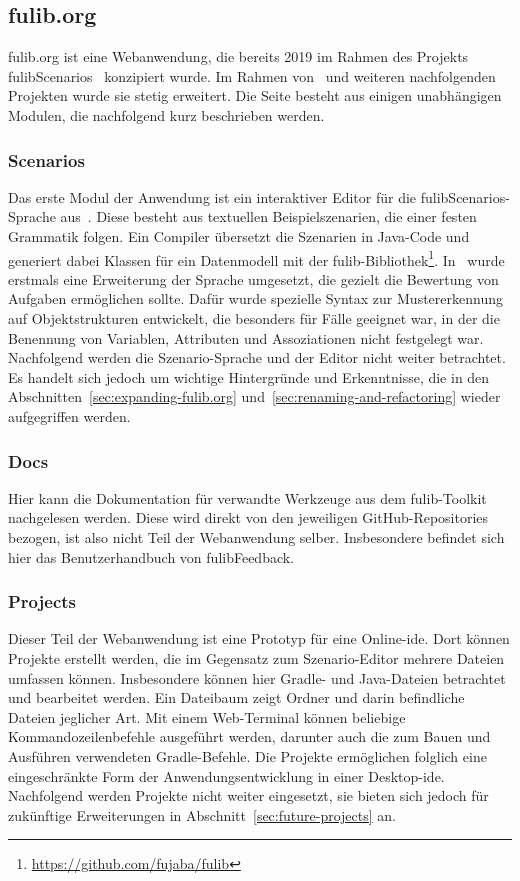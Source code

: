 \subsection{fulib.org}\label{subsec:fulib.org}

fulib.org ist eine Webanwendung, die bereits 2019 im Rahmen des Projekts fulibScenarios~\cite{explain} konzipiert wurde.
Im Rahmen von~\cite{bachelor-thesis} und weiteren nachfolgenden Projekten wurde sie stetig erweitert.
Die Seite besteht aus einigen unabhängigen Modulen, die nachfolgend kurz beschrieben werden.

\subsubsection{Scenarios}
Das erste Modul der Anwendung ist ein interaktiver Editor für die fulibScenarios-Sprache aus~\cite{explain}.
Diese besteht aus textuellen Beispielszenarien, die einer festen Grammatik folgen.
Ein Compiler übersetzt die Szenarien in Java-Code und generiert dabei Klassen für ein Datenmodell mit der fulib-Bibliothek\footnote{\url{https://github.com/fujaba/fulib}}.
In~\cite{bachelor-thesis} wurde erstmals eine Erweiterung der Sprache umgesetzt, die gezielt die Bewertung von Aufgaben ermöglichen sollte.
Dafür wurde spezielle Syntax zur Mustererkennung auf Objektstrukturen entwickelt, die besonders für Fälle geeignet war, in der die Benennung von Variablen, Attributen und Assoziationen nicht festgelegt war.
Nachfolgend werden die Szenario-Sprache und der Editor nicht weiter betrachtet.
Es handelt sich jedoch um wichtige Hintergründe und Erkenntnisse, die in den Abschnitten~\ref{sec:expanding-fulib.org} und~\ref{sec:renaming-and-refactoring} wieder aufgegriffen werden.

\subsubsection{Docs}
Hier kann die Dokumentation für verwandte Werkzeuge aus dem fulib-Toolkit nachgelesen werden.
Diese wird direkt von den jeweiligen GitHub-Repositories bezogen, ist also nicht Teil der Webanwendung selber.
Insbesondere befindet sich hier das Benutzerhandbuch von fulibFeedback.

\subsubsection{Projects}
Dieser Teil der Webanwendung ist eine Prototyp für eine Online-\ac{ide}.
Dort können Projekte erstellt werden, die im Gegensatz zum Szenario-Editor mehrere Dateien umfassen können.
Insbesondere können hier Gradle- und Java-Dateien betrachtet und bearbeitet werden.
Ein Dateibaum zeigt Ordner und darin befindliche Dateien jeglicher Art.
Mit einem Web-Terminal können beliebige Kommandozeilenbefehle ausgeführt werden, darunter auch die zum Bauen und Ausführen verwendeten Gradle-Befehle.
Die Projekte ermöglichen folglich eine eingeschränkte Form der Anwendungsentwicklung in einer Desktop-\ac{ide}.
Nachfolgend werden Projekte nicht weiter eingesetzt, sie bieten sich jedoch für zukünftige Erweiterungen in Abschnitt~\ref{sec:future-projects} an.

